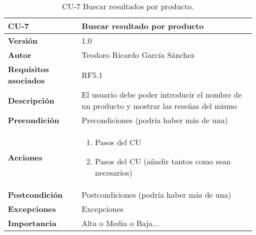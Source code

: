 \begin{table}[p]
	\centering
	\begin{tabularx}{\linewidth}{ p{} p{} }
		\toprule
		\textbf{CU-7}    & \textbf{Buscar resultado por producto}\\
		\toprule
		\textbf{Versión}              & 1.0    \\
		\textbf{Autor}                & Teodoro Ricardo García Sánchez \\
		\textbf{Requisitos asociados} & RF5.1 \\
		\textbf{Descripción}          & El usuario debe poder introducir el nombre de un producto y mostrar las reseñas del mismo \\
		\textbf{Precondición}         & Precondiciones (podría haber más de una) \\
		\textbf{Acciones}             &
		\begin{enumerate}
			\def\labelenumi{\arabic{enumi}.}
			\tightlist
			\item Pasos del CU
			\item Pasos del CU (añadir tantos como sean necesarios)
		\end{enumerate}\\
		\textbf{Postcondición}        & Postcondiciones (podría haber más de una) \\
		\textbf{Excepciones}          & Excepciones \\
		\textbf{Importancia}          & Alta o Media o Baja... \\
		\bottomrule
	\end{tabularx}
	\caption{CU-7 Buscar resultados por producto.}
\end{table}
